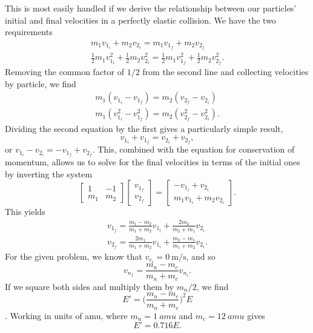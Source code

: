 \documentclass[../feynman-lectures-on-physics.tex]{subfiles}
\begin{document}
\begin{questions}
	\begin{solution}
		This is most easily handled if we derive the relationship between our
		particles' initial and final velocities in a perfectly elastic collision. We
		have the two requirements
		\begin{gather*}
			m_1v_{1_i} + m_2v_{2_i} = m_1v_{1_f} + m_2v_{2_f} \\
			\frac{1}{2}m_1v_{1_i}^2 + \frac{1}{2}m_2v_{2_i}^2 =
			\frac{1}{2}m_1v_{1_f}^2 + \frac{1}{2}m_2v_{2_f}^2.
		\end{gather*}
		Removing the common factor of $1/2$ from the second line and collecting
		velocities by particle, we find
		\begin{gather*}
			m_1(v_{1_i} - v_{1_f}) = m_2(v_{2_f} - v_{2_i}) \\
			m_1(v_{1_i}^2 - v_{1_f}^2) = m_2(v_{2_f}^2 - v_{2_i}^2).
		\end{gather*}
		Dividing the second equation by the first gives a particularly simple
		result,
		\[
			v_{1_i} + v_{1_f} = v_{2_i} + v_{2_f},
		\]
		or $v_{1_i} - v_{2_i} = -v_{1_f} + v_{2_f}$. This, combined with the
		equation for conservation of momentum, allows us to solve for the final
		velocities in terms of the initial ones by inverting the system
		\[
			\begin{bmatrix}
				1 & -1 \\
				m_1 & m_2
			\end{bmatrix}
			\begin{bmatrix}
				v_{1_f} \\
				v_{2_f}
			\end{bmatrix}
			=
			\begin{bmatrix}
				-v_{1_i} + v_{2_i} \\
				m_1v_{1_i} + m_2v_{2_i}
			\end{bmatrix}.
		\]
		This yields
		\begin{gather*}
			v_{1_f} = \frac{m_1-m_2}{m_1+m_2}v_{1_i} + \frac{2m_2}{m_2+m_1}v_{2_i} \\
			v_{2_f} = \frac{2m_1}{m_1+m_2}v_{1_i} + \frac{m_2-m_1}{m_1+m_2}v_{2_i}.
		\end{gather*}
		For the given problem, we know that $v_{c_i}=\SI{0}{\meter\per\second}$, and
		so
		\[
			v_{n_f} = \frac{m_n-m_c}{m_n+m_c}v_{n_i}.
		\]
		If we square both sides and multiply them by $m_n/2$, we find
		\[
			E' = \Big(\frac{m_n-m_c}{m_n+m_c}\Big)^2E
		\].
		Working in units of amu, where $m_n=\SI{1}{amu}$ and $m_c=\SI{12}{amu}$
		gives
		\[
			E' = 0.716E.
		\]
	\end{solution}


\end{questions}
\end{document}
